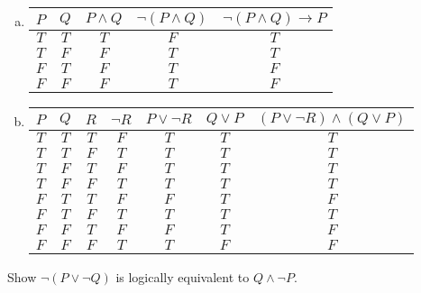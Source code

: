 \documentclass[11pt,letterpaper]{article}
\begin{document}
\sol 
\begin{enumerate}[(a)]
\item \phantom{.} \par
	\begin{table}[h]
	\centering
	\begin{tabular}{c|c||c|c||c}
	$P$ & $Q$ & $P \wedge Q$ & $\neg(P \wedge Q)$ & $\neg(P \wedge Q) \to P$ \\ \hline
	$T$ & $T$ & $T$ & $F$ & $T$ \\
	$T$ & $F$ & $F$ & $T$ & $T$ \\
	$F$ & $T$ & $F$ & $T$ & $F$ \\
	$F$ & $F$ & $F$ & $T$ & $F$
	\end{tabular}
	\end{table}

\item \phantom{.} \par
	\begin{table}[h]
	\centering
	\begin{tabular}{c|c|c||c|c|c||c}
	$P$ & $Q$ & $R$ & $\neg R$ & $P \vee \neg R$ & $Q \vee P$ & $(P \vee \neg R) \wedge (Q \vee P)$ \\ \hline
	$T$ & $T$ & $T$ & $F$ & $T$ & $T$ & $T$ \\ 
	$T$ & $T$ & $F$ & $T$ & $T$ & $T$ & $T$ \\
	$T$ & $F$ & $T$ & $F$ & $T$ & $T$ & $T$ \\
	$T$ & $F$ & $F$ & $T$ & $T$ & $T$ & $T$ \\
	$F$ & $T$ & $T$ & $F$ & $F$ & $T$ & $F$ \\ 
	$F$ & $T$ & $F$ & $T$ & $T$ & $T$ & $T$ \\ 
	$F$ & $F$ & $T$ & $F$ & $F$ & $T$ & $F$ \\
	$F$ & $F$ & $F$ & $T$ & $T$ & $F$ & $F$
	\end{tabular}
	\end{table}
\end{enumerate}



\newpage



 Show $\neg (P \vee \neg Q)$ is logically equivalent to $Q \wedge \neg P$. \pspace
\end{document}
